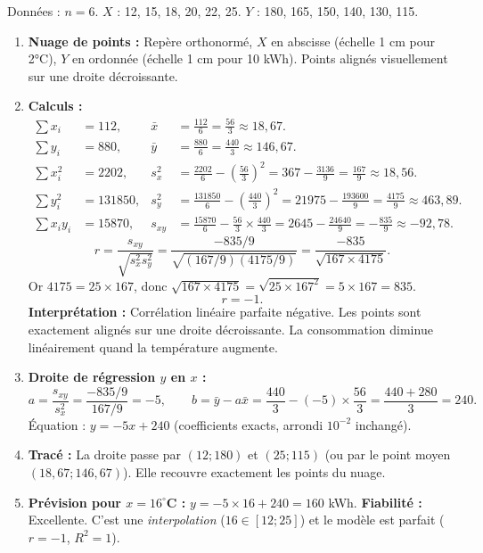\documentclass[11pt]{article}
\begin{document}
\begin{corrige}
Données : $n=6$.
$X$ : 12, 15, 18, 20, 22, 25.
$Y$ : 180, 165, 150, 140, 130, 115.

\begin{enumerate}
\item \textbf{Nuage de points :} Repère orthonormé, $X$ en abscisse (échelle 1 cm pour 2°C), $Y$ en ordonnée (échelle 1 cm pour 10 kWh). Points alignés visuellement sur une droite décroissante.

\item \textbf{Calculs :}
\[
\begin{aligned}
\sum x_i &= 112, & \bar{x} &= \frac{112}{6} = \frac{56}{3} \approx 18,67. \\
\sum y_i &= 880, & \bar{y} &= \frac{880}{6} = \frac{440}{3} \approx 146,67. \\
\sum x_i^2 &= 2202, & s_x^2 &= \frac{2202}{6} - \left(\frac{56}{3}\right)^2 = 367 - \frac{3136}{9} = \frac{167}{9} \approx 18,56. \\
\sum y_i^2 &= 131850, & s_y^2 &= \frac{131850}{6} - \left(\frac{440}{3}\right)^2 = 21975 - \frac{193600}{9} = \frac{4175}{9} \approx 463,89. \\
\sum x_i y_i &= 15870, & s_{xy} &= \frac{15870}{6} - \frac{56}{3}\times\frac{440}{3} = 2645 - \frac{24640}{9} = -\frac{835}{9} \approx -92,78.
\end{aligned}
\]
\[
r = \frac{s_{xy}}{\sqrt{s_x^2 s_y^2}} = \frac{-835/9}{\sqrt{(167/9)(4175/9)}} = \frac{-835}{\sqrt{167 \times 4175}}.
\]
Or $4175 = 25 \times 167$, donc $\sqrt{167 \times 4175} = \sqrt{25 \times 167^2} = 5 \times 167 = 835$.
\[
\boxed{r = -1}.
\]
\textbf{Interprétation :} Corrélation linéaire parfaite négative. Les points sont exactement alignés sur une droite décroissante. La consommation diminue linéairement quand la température augmente.

\item \textbf{Droite de régression $y$ en $x$ :}
\[
a = \frac{s_{xy}}{s_x^2} = \frac{-835/9}{167/9} = -5, \qquad
b = \bar{y} - a\bar{x} = \frac{440}{3} - (-5)\times\frac{56}{3} = \frac{440+280}{3} = 240.
\]
Équation : $\boxed{y = -5x + 240}$ (coefficients exacts, arrondi $10^{-2}$ inchangé).

\item \textbf{Tracé :} La droite passe par $(12;180)$ et $(25;115)$ (ou par le point moyen $(18,67; 146,67)$). Elle recouvre exactement les points du nuage.

\item \textbf{Prévision pour $x=16^\circ$C :} $y = -5\times 16 + 240 = 160$ kWh.
\textbf{Fiabilité :} Excellente. C'est une \emph{interpolation} ($16 \in [12; 25]$) et le modèle est parfait ($r=-1$, $R^2=1$).
\end{enumerate}
\end{corrige}
\end{document}
